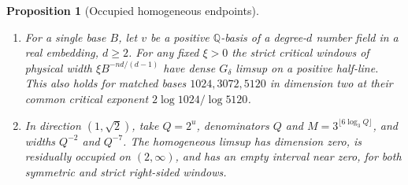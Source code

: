 \documentclass[11pt,reqno,a4paper]{amsart}
\newtheorem{proposition}[theorem]{Proposition}
\theoremstyle{remark}
\numberwithin{equation}{section}
\begin{document}
\begin{proposition}[Occupied homogeneous endpoints]\label{prop:occupied}
\leavevmode
\begin{enumerate}
\item For a single base \(B\), let \(v\) be a positive \(\mathbb Q\)-basis of a degree-\(d\) number field in a real embedding, \(d\ge2\). For any fixed \(\xi>0\) the strict critical windows of physical width \(\xi B^{-nd/(d-1)}\) have dense \(G_\delta\) limsup on a positive half-line. This also holds for matched bases \(1024,3072,5120\) in dimension two at their common critical exponent \(2\log1024/\log5120\).
\item In direction \((1,\sqrt2)\), take \(Q=2^u\), denominators \(Q\) and \(M=3^{\lfloor6\log_3 Q\rfloor}\), and widths \(Q^{-2}\) and \(Q^{-7}\). The homogeneous limsup has dimension zero, is residually occupied on \((2,\infty)\), and has an empty interval near zero, for both symmetric and strict right-sided windows.
\end{enumerate}
\end{proposition}
\end{document}
